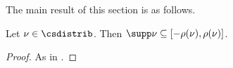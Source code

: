 The main result of this section is as follows.

\begin{theorem}
  \label{thm:support_limsup}
  \notready
  Let $\nu \in \csdistrib$.
  Then $\supp \nu \subseteq [-\rho(\nu), \rho(\nu)]$.
\end{theorem}

\begin{proof}
  As in \cite[Lemma 4.9]{chen2025}.
\end{proof}


%

\tableofcontents









